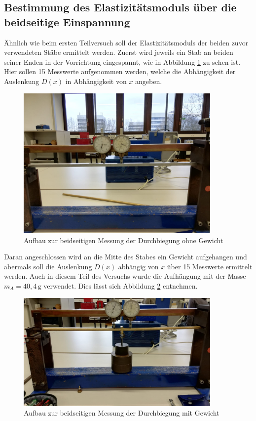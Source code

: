 \subsection{Bestimmung des Elastizitätsmoduls über die beidseitige Einspannung}

Ähnlich wie beim ersten Teilversuch soll der Elastizitätsmoduls der beiden zuvor verwendeten 
Stäbe ermittelt werden. Zuerst wird jeweils ein Stab an beiden seiner Enden in der Vorrichtung 
eingespannt, wie in Abbildung \ref{fig:durchfuehrung3} zu sehen ist.
Hier sollen 15 Messwerte aufgenommen werden, welche die Abhängigkeit der Auslenkung $D(x)$ in 
Abhängigkeit von $x$ angeben. 

\begin{figure}[H]
    \centering
    \includegraphics[width=10cm]{3.jpg}
    \caption{Aufbau zur beidseitigen Messung der Durchbiegung ohne Gewicht}
    \label{fig:durchfuehrung3}
\end{figure}
\noindent
Daran angeschlossen wird an die Mitte des Stabes ein Gewicht
aufgehangen und abermals soll die Auslenkung $D(x)$ abhängig von $x$ über 15 Messwerte
ermittelt werden. Auch in diesem 
Teil des Versuchs wurde die Aufhängung mit der Masse $m_{A} = 40,4\, \si{\gram}$ verwendet.
Dies lässt sich Abbildung \ref{fig:durchfuehrung4} entnehmen.

\begin{figure}[H]
    \centering
    \includegraphics[width=10cm]{4.jpg}
    \caption{Aufbau zur beidseitigen Messung der Durchbiegung mit Gewicht}
    \label{fig:durchfuehrung4}
\end{figure}

